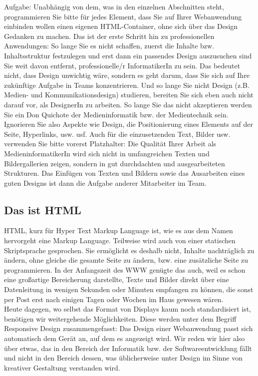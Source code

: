 Aufgabe: Unabhängig von dem, was in den einzelnen Abschnitten steht, programmieren Sie bitte für jedes Element, dass Sie auf Ihrer Webanwendung einbinden wollen einen eigenen HTML-Container, ohne sich über das Design Gedanken zu machen. Das ist der erste Schritt hin zu professionellen Anwendungen: So lange Sie es nicht schaffen, zuerst die Inhalte bzw. Inhaltsstruktur festzulegen und erst dann ein passendes Design auszusuchen sind Sie weit davon entfernt, professionelle/r InformatikerIn zu sein. Das bedeutet nicht, dass Design unwichtig wäre, sondern es geht darum, dass Sie sich auf Ihre zukünftige Aufgabe in Teams konzentrieren. Und so lange Sie nicht Design (z.B. Medien- und Kommunikationsdesign) studieren, bereiten Sie sich eben auch nicht darauf vor, als DesignerIn zu arbeiten. So lange Sie das nicht akzeptieren werden Sie ein Don Quichote der Medieninformatik bzw. der Medientechnik sein.\\

Ignorieren Sie also Aspekte wie Design, die Positionierung eines Elements auf der Seite, Hyperlinks, usw. usf. Auch für die einzusetzenden Text, Bilder usw. verwenden Sie bitte vorerst Platzhalter: Die Qualität Ihrer Arbeit als MedieninformatikerIn wird sich nicht in umfangreichen Texten und Bildergallerien zeigen, sondern in gut durchdachten und ausgearbeiteten Strukturen. Das Einfügen von Texten und Bildern sowie das Ausarbeiten eines guten Designs ist dann die Aufgabe anderer Mitarbeiter im Team.

\subsection{Das ist HTML}

HTML, kurz für Hyper Text Markup Language ist, wie es aus dem Namen hervorgeht eine Markup Language. Teilweise wird auch von einer statischen Skriptsprache gesprochen. Sie ermöglicht es deshalb nicht, Inhalte nachträglich zu ändern, ohne gleiche die gesamte Seite zu ändern, bzw. eine zusätzliche Seite zu programmieren. In der Anfangszeit des WWW genügte das auch, weil es schon eine großartige Bereicherung darstellte, Texte und Bilder direkt über eine Datenleitung in wenigen Sekunden oder Minuten empfangen zu können, die sonst per Post erst nach einigen Tagen oder Wochen im Haus gewesen wären. \\

Heute dagegen, wo selbst das Format von Displays kaum noch standardisiert ist, benötigen wir weitergehende Möglichkeiten. Diese werden unter dem Begriff Responsive Design zusammengefasst: Das Design einer Webanwendung passt sich automatisch dem Gerät an, auf dem es angezeigt wird. Wir reden wir hier also über etwas, das in den Bereich der Informatik bzw. der Softwareentwicklung fällt und nicht in den Bereich dessen, was üblicherweise unter Design im Sinne von kreativer Gestaltung verstanden wird.\\

